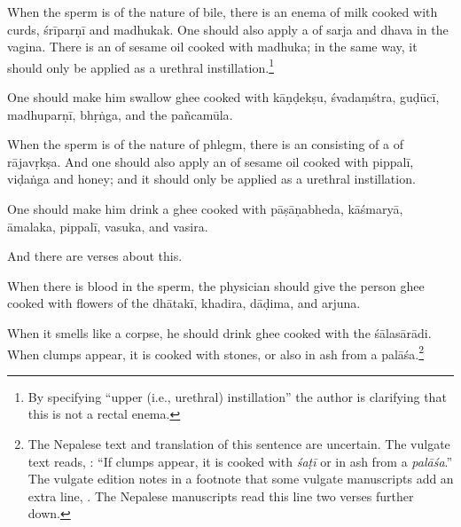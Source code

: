 \begin{translation}
 \item[6.2]
 
 When the sperm is of the nature of bile, there is  an
enema of milk cooked with curds, \gls{śrīparṇī}
and \gls{madhuka}k. %
One should also apply a  of \gls{sarja} and
\gls{dhava} in the vagina. %
There is an  of sesame oil cooked with
\gls{madhuka}; in the same way, it should only be applied as a
urethral instillation.\footnote{By specifying “upper (i.e., urethral) instillation”
    the author is clarifying that this is not a rectal enema.}

  One should make him swallow ghee cooked with 
  \gls{kāṇḍekṣu},
  \gls{śvadaṃśtra},
  \gls{guḍūcī},
  \gls{madhuparṇī},
  \gls{bhṛṅga},
  and 
  the \gls{pañcamūla}.
  
 \item[6.3]
 
When the sperm is of the nature of phlegm, there is  an
 consisting of a   of
\gls{rājavṛkṣa}.  And one should also apply an  of sesame oil cooked with \gls{pippalī}, \gls{viḍaṅga} and
honey; and it should only be applied as a urethral instillation. 

One should make him drink a ghee cooked with 
\gls{pāṣāṇabheda},
\gls{kāśmaryā},
\gls{āmalaka},
\gls{pippalī},
\gls{vasuka}, and 
\gls{vasira}.
 
 
\item [3.2.7]
 
  And there are verses about this.
 
 \begin{sloka}
     When there is blood in the sperm, the physician should give the person ghee 
 cooked with 
 flowers of the \gls{dhātakī},
 \gls{khadira},
 \gls{dāḍima},
 and \gls{arjuna}.
 \end{sloka}
 
 \item [3.2.8]
 
\begin{sloka}
     When it smells like a corpse, he should drink ghee cooked with the
\gls{śālasārādi}. %
\dag When clumps appear, it is cooked with stones, or also in ash from a
\gls{palāśa}.\footnote{The Nepalese text and translation of this sentence
    are uncertain. The vulgate text reads, :  “If clumps appear, it is cooked with
    \emph{śaṭī} or in ash from a \emph{palāśa}.”  The vulgate edition notes in a 
    footnote that some vulgate manuscripts add an extra line, . The Nepalese manuscripts read this line two verses 
    further 
    down.}



\end{sloka}
\end{translation}
